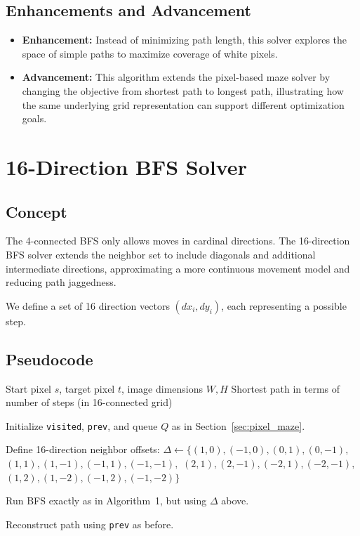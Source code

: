 \documentclass[11pt]{article}
\begin{document}
\subsection{Enhancements and Advancement}

\begin{itemize}
  \item \textbf{Enhancement:} Instead of minimizing path length, this
  solver explores the space of simple paths to maximize coverage of
  white pixels.
  \item \textbf{Advancement:} This algorithm extends the pixel-based
  maze solver by changing the objective from shortest path to longest
  path, illustrating how the same underlying grid representation can
  support different optimization goals.
\end{itemize}
\clearpage
\section{16-Direction BFS Solver}
\label{sec:16_dir_bfs}

\subsection{Concept}

The 4-connected BFS only allows moves in cardinal directions. The
16-direction BFS solver extends the neighbor set to include diagonals
and additional intermediate directions, approximating a more continuous
movement model and reducing path jaggedness.

We define a set of 16 direction vectors $(dx_i,dy_i)$, each representing
a possible step.

\subsection{Pseudocode}

\begin{algorithm}[h!]
\caption{16-Direction BFS Solver}
\begin{algorithmic}[1]
\Require Start pixel $s$, target pixel $t$, image dimensions $W,H$
\Ensure Shortest path in terms of number of steps (in 16-connected grid)

\State Initialize \texttt{visited}, \texttt{prev}, and queue $Q$ as in
Section~\ref{sec:pixel_maze}.

\State Define 16-direction neighbor offsets:
\State \hspace{1em} $\Delta \gets \{(1,0),(-1,0),(0,1),(0,-1),$
\State \hspace{4em} $(1,1),(1,-1),(-1,1),(-1,-1),$
\State \hspace{4em} $(2,1),(2,-1),(-2,1),(-2,-1),$
\State \hspace{4em} $(1,2),(1,-2),(-1,2),(-1,-2)\}$

\State Run BFS exactly as in Algorithm~1, but using $\Delta$ above.

\State Reconstruct path using \texttt{prev} as before.
\end{algorithmic}
\end{algorithm}
\end{document}
